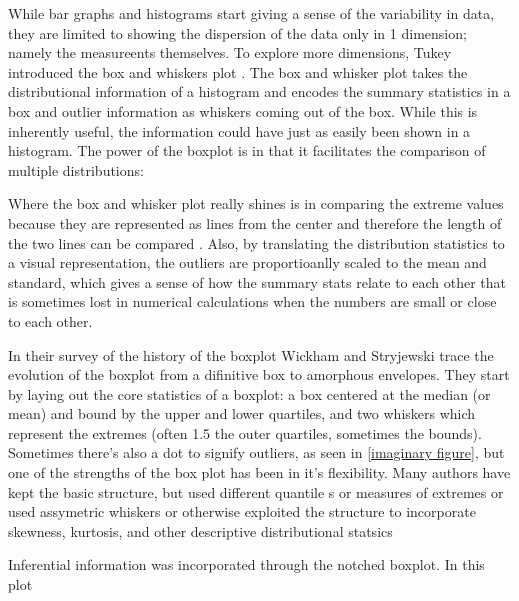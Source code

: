 While bar graphs and histograms start giving a sense of the variability in
data, they are limited to showing the dispersion of the data only in 1
dimension; namely the measureents themselves. To explore more dimensions,
Tukey introduced the box and whiskers plot \cite{tukey1977e}. The box and
whisker plot takes the distributional information of a
histogram and encodes the summary statistics in a box and outlier information as
whiskers coming out of the box. While this is inherently useful, the
information could have just as easily been shown in a histogram. The power of
the boxplot is in that it facilitates the comparison of multiple distributions:
\begin{figure}
\end{figure}

Where the box and whisker plot really shines is in comparing the extreme
values because they are represented as lines from the center and therefore the
length of the two lines can be compared \cite{tukey1977e}.  Also, by
translating the distribution statistics to a visual representation, the
outliers are proportioanlly scaled to the mean and standard, which gives a
sense of how the summary stats relate to each other that is sometimes lost in
numerical calculations when the numbers are small or close to each
other. %

In their survey of the history of the
boxplot \cite{Wickham2011} Wickham and Stryjewski trace the evolution of the
boxplot from a difinitive box to amorphous envelopes.  They start by laying out
the core statistics of a boxplot: a box centered at the median (or mean) and
bound by the upper and lower quartiles, and two whiskers which represent the extremes
(often 1.5 the outer quartiles, sometimes the \alpha bounds). Sometimes there's
also a dot to signify outliers, as seen in \ref{imaginary figure}, but one of
the strengths of the box plot has been in it's flexibility. Many authors have
kept the basic structure, but used different quantile \cite{Hyndman}s or
measures of extremes \cite{Frigge, carter} or used assymetric whiskers \cite{Rousseuw}
or otherwise exploited the structure to incorporate skewness, kurtosis, and
other descriptive distributional statsics \cite{ Aslam, choon, Marmelejo}






Inferential information was incorporated through the notched boxplot. \cite{McGill} %
In this plot 








